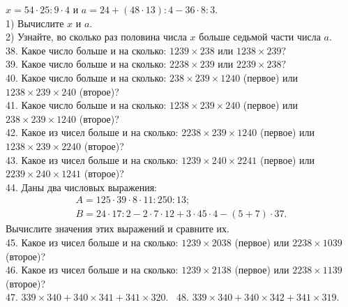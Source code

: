 $x=54\cdot25:9\cdot4$ и $a=24+(48\cdot13):4-36\cdot8:3.$\\
1) Вычислите $x$ и $a.$\\
2) Узнайте, во сколько раз половина числа $x$ больше седьмой части числа $a.$\\
38. Какое число больше и на сколько: $1239\times238$ или $1238\times239?$\\
39. Какое число больше и на сколько: $2238\times239$ или $2239\times238?$\\
40. Какое число больше и на сколько: $238\times239\times1240$ (первое) или $1238\times239\times240$ (второе)?\\
41. Какое число больше и на сколько: $1238\times239\times240$ (первое) или $238\times239\times1240$ (второе)?\\
42. Какое из чисел больше и на сколько: $2238\times239\times1240$ (первое) или $1238\times239\times2240$ (второе)?\\
43. Какое из чисел больше и на сколько: $1239\times240\times2241$ (первое) или $2239\times240\times1241$ (второе)?\\
44. Даны два числовых выражения:
$$\begin{array}{l} A=125\cdot39\cdot8\cdot11:250:13;\\ B=24\cdot17:2-2\cdot7\cdot12+3\cdot45\cdot4-(5+7)\cdot37.\end{array}$$
Вычислите значения этих выражений и сравните их.\\
45. Какое из чисел больше и на сколько: $1239\times2038$ (первое) или $2238\times1039$ (второе)?\\
46. Какое из чисел больше и на сколько: $1239\times2138$ (первое) или $2238\times1139$ (второе)?\\
47. $339 \times 340 + 340 \times 341 + 341 \times 320.$ \
48. $339 \times 340 + 340 \times 342 + 341 \times 319.$
\newpage
